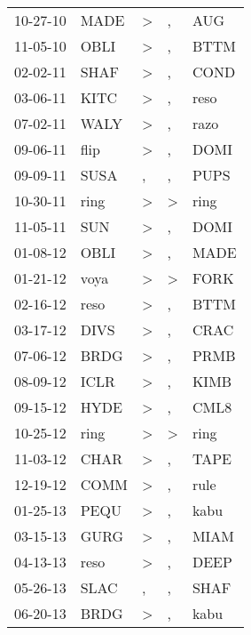 \begin{supertabular}{lllll}
 10-27-10 &   MADE &     \textgreater &                , &    AUG \\
 11-05-10 &   OBLI &     \textgreater &                , &   BTTM \\
 02-02-11 &   SHAF &     \textgreater &                , &   COND \\
 03-06-11 &   KITC &     \textgreater &                , &   reso \\
 07-02-11 &   WALY &     \textgreater &                , &   razo \\
 09-06-11 &   flip &     \textgreater &                , &   DOMI \\
 09-09-11 &   SUSA &                , &                , &   PUPS \\
 10-30-11 &   ring &     \textgreater &     \textgreater &   ring \\
 11-05-11 &    SUN &     \textgreater &                , &   DOMI \\
 01-08-12 &   OBLI &     \textgreater &                , &   MADE \\
 01-21-12 &   voya &     \textgreater &     \textgreater &   FORK \\
 02-16-12 &   reso &     \textgreater &                , &   BTTM \\
 03-17-12 &   DIVS &     \textgreater &                , &   CRAC \\
 07-06-12 &   BRDG &     \textgreater &                , &   PRMB \\
 08-09-12 &   ICLR &     \textgreater &                , &   KIMB \\
 09-15-12 &   HYDE &     \textgreater &                , &   CML8 \\
 10-25-12 &   ring &     \textgreater &     \textgreater &   ring \\
 11-03-12 &   CHAR &     \textgreater &                , &   TAPE \\
 12-19-12 &   COMM &     \textgreater &                , &   rule \\
 01-25-13 &   PEQU &     \textgreater &                , &   kabu \\
 03-15-13 &   GURG &     \textgreater &                , &   MIAM \\
 04-13-13 &   reso &     \textgreater &                , &   DEEP \\
 05-26-13 &   SLAC &                , &                , &   SHAF \\
 06-20-13 &   BRDG &     \textgreater &                , &   kabu \\

\end{supertabular}
